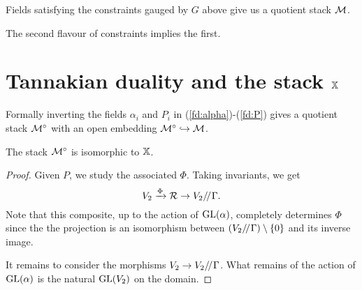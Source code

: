 \documentclass{amsart}
\theoremstyle{definition}
\begin{document}
\begin{definition}
Fields satisfying the constraints gauged by $G$ above give us a quotient stack $\mathcal{M}$.
\end{definition}

\begin{remark}
The second flavour of constraints implies the first.
\end{remark}

\section{Tannakian duality and the stack $\mathbb{X}$}

Formally inverting the fields $\alpha_i$ and $P_i$ in (\ref{fd:alpha})-(\ref{fd:P}) gives a quotient stack ${\mathcal{M}}^\circ$ with an open embedding ${\mathcal{M}}^\circ \hookrightarrow \mathcal{M}$.



\begin{proposition}\label{prop:tannaka}
The stack ${\mathcal{M}}^\circ$ is isomorphic to $\mathbb{X}$.
\end{proposition}

\begin{proof}
Given $P$, we study the associated $\Phi$.
Taking invariants, we get 
$$V_2 \xrightarrow{\Phi} \mathcal{R} \rightarrow V_2/ \! /_{}\Gamma.$$
Note that this composite, up to the action of $\operatorname{GL}(\alpha)$, completely determines $\Phi$ since the the projection is an isomorphism between $(V_2 / \! /_{}\Gamma) \setminus \{0\}$ and its inverse image.

It remains to consider the morphisms $V_2 \rightarrow V_2/ \! /_{}\Gamma$.
What remains of the action of $\operatorname{GL}(\alpha)$ is the natural $\operatorname{GL}(V_2)$ on the domain.
\end{proof}



\end{document}
